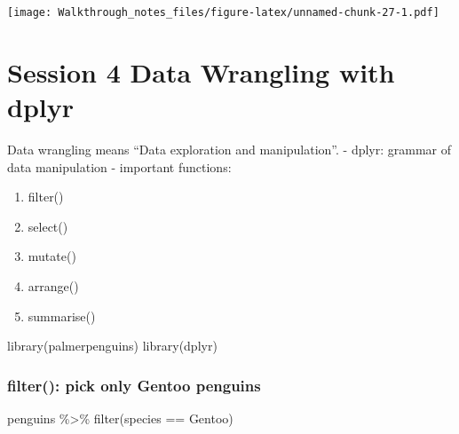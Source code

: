 \documentclass[
]{article}
\newenvironment{Shaded}{\begin{snugshade}}{\end{snugshade}}
\newcommand{\FunctionTok}[1]{\textcolor[rgb]{0.00,0.00,0.00}{#1}}
\newcommand{\NormalTok}[1]{#1}
\newcommand{\SpecialCharTok}[1]{\textcolor[rgb]{0.00,0.00,0.00}{#1}}
\newcommand{\StringTok}[1]{\textcolor[rgb]{0.31,0.60,0.02}{#1}}
\providecommand{\tightlist}{%
  \setlength{\itemsep}{0pt}\setlength{\parskip}{0pt}}
\begin{document}
\texttt{[image: Walkthrough\_notes\_files/figure-latex/unnamed-chunk-27-1.pdf]}

\hypertarget{session-4-data-wrangling-with-dplyr}{%
\section{Session 4 Data Wrangling with
dplyr}\label{session-4-data-wrangling-with-dplyr}}

Data wrangling means ``Data exploration and manipulation''. - dplyr:
grammar of data manipulation - important functions:

\begin{enumerate}
\def\labelenumi{\arabic{enumi}.}
\tightlist
\item
  filter()
\item
  select()
\item
  mutate()
\item
  arrange()
\item
  summarise()
\end{enumerate}

\begin{Shaded}
\begin{Highlighting}[]
\FunctionTok{library}\NormalTok{(palmerpenguins)}
\FunctionTok{library}\NormalTok{(dplyr)}
\end{Highlighting}
\end{Shaded}

\hypertarget{filter-pick-only-gentoo-penguins}{%
\subsubsection{filter(): pick only Gentoo
penguins}\label{filter-pick-only-gentoo-penguins}}

\begin{Shaded}
\begin{Highlighting}[]
\NormalTok{penguins }\SpecialCharTok{\%\textgreater{}\%} 
  \FunctionTok{filter}\NormalTok{(species }\SpecialCharTok{==} \StringTok{\textquotesingle{}Gentoo\textquotesingle{}}\NormalTok{)}
\end{Highlighting}
\end{Shaded}
\end{document}
